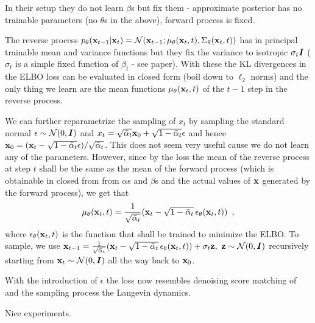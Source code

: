 In their setup they do not learn $\beta$s but fix them - approximate posterior has no trainable parameters (no $\theta$s in the above), forward process is fixed.

The reverse process $p_{\theta}({\mathbf{x}}_{t-1} \vert {\mathbf{x}}_{t}) = \mathcal{N}({\mathbf{x}}_{t-1}; \mu_{\theta}({\mathbf{x}}_t, t), \Sigma_{\theta}({\mathbf{x}}_t, t))$ has in principal trainable mean and variance functions but they fix the variance to isotropic $\sigma_t {\bm{I}}$ ($\sigma_t$ is a simple fixed function of $\beta_t$ - see paper).
With these the KL divergences in the ELBO loss can be evaluated in closed form (boil down to $\ell_2$ norms) and the only thing we learn are the mean functions $\mu_{\theta}({\mathbf{x}}_t, t)$ of the $t-1$ step in the reverse process.

We can further reparametrize the sampling of $x_t$ by sampling the standard normal $\epsilon \sim \mathcal{N}(0, {\bm{I}})$ and $x_t = \sqrt{\bar\alpha_t}{\mathbf{x}}_{0} + \sqrt{1-\bar\alpha_t} \epsilon$ and hence ${\mathbf{x}}_0 = ({\mathbf{x}}_t - \sqrt{1-\bar\alpha_t} \epsilon) / \sqrt{\bar\alpha_t}$.
This does not seem very useful cause we do not learn any of the parameters. 
However, since by the loss the mean of the reverse process at step $t$ shall be the same as the mean of the forward process (which is obtainable in closed from from $\alpha$s and $\beta$s and the actual values of ${\mathbf{x}}$ generated by the forward process), we get that 
\begin{align*}
\mu_{\theta}({\mathbf{x}}_t, t) = \frac{1}{\sqrt{\bar\alpha_t}}({\mathbf{x}}_t - \sqrt{1-\bar\alpha_t} \, \epsilon_\theta({\mathbf{x}}_t, t)) \enspace ,
\end{align*}
where $\epsilon_\theta({\mathbf{x}}_t, t)$ is the function that shall be trained to minimize the ELBO.
To sample, we use $\rvx_{t-1} = \frac{1}{\sqrt{\bar\alpha_t}}(\rvx_t - \sqrt{1-\bar\alpha_t} \, \epsilon_\theta(\rvx_t, t)) + \sigma_t \rvz, \ \rvz \sim \mathcal{N}(0, \mI)$ recursively starting from ${\mathbf{x}}_t \sim \mathcal{N}(0, {\bm{I}})$ all the way back to ${\mathbf{x}}_0$.

With the introduction of $\epsilon$ the loss now resembles denoising score matching of \cite{song_generative_2020} and the sampling process the Langevin dynamics.

Nice experiments.












